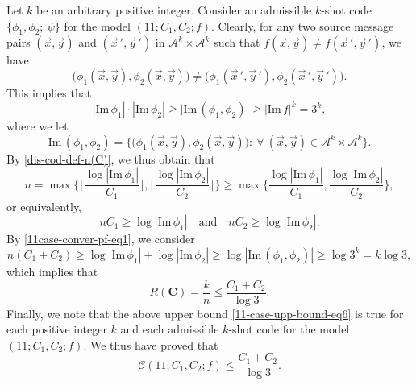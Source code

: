 \documentclass[11pt,draftclsnofoot,onecolumn]{IEEEtran}
\newcommand{\mbC}{\mathbf{C}}
\def\Im{\mathrm{Im}}
\begin{document}
\begin{IEEEproof}
Let $k$ be an arbitrary positive integer.
Consider an admissible $k$-shot code  $\big\{\phi_{1},\phi_{2};~\psi\big\}$ for the model $(11;C_1,C_2;f)$.
Clearly,  for any two  source message pairs $(\vec{x},\vec{y})$ and $(\vec{x}\,',\vec{y}\,')$ in $\mathcal{A}^k\times\mathcal{A}^k$ such that $f(\vec{x},\vec{y})\neq f(\vec{x}\,',\vec{y}\,')$, we have
\begin{equation*}
\big(\phi_{1}(\vec{x},\vec{y}),\phi_{2}(\vec{x},\vec{y})\big)\neq
\big(\phi_{1}(\vec{x}\,',\vec{y}\,'),\phi_{2}(\vec{x}\,',\vec{y}\,')\big)
.\label{eq:case11,converse-pf-0}
\end{equation*}
This implies that
\begin{equation}
|\Im\,\phi_1|\cdot|\Im\,\phi_2|\geq\big|\Im\,(\phi_{1},\phi_{2})\big|\geq |\Im\,f|^k=3^k,\label{11case-conver-pf-eq1}
\end{equation}
where we let
\begin{equation*}
\Im\,(\phi_{1},\phi_{2})=\Big\{\big(\phi_{1}(\vec{x},\vec{y}),\phi_{2}(\vec{x},\vec{y})\big):~\forall~
(\vec{x},\vec{y})\in\mathcal{A}^k\times\mathcal{A}^k\Big\}.
\end{equation*}
By \eqref{dis-cod-def-n(C)}, we thus obtain that
\begin{equation*}
n=\max\bigg\{\bigg\lceil\frac{\log|\Im\,\phi_{1}|}{C_1}\bigg\rceil,\bigg\lceil\frac{\log|\Im\,\phi_{2}|}{C_2}
\bigg\rceil\bigg\}\geq\max\bigg\{\frac{\log|\Im\,\phi_{1}|}{C_1},\frac{\log|\Im\,\phi_{2}|}{C_2}
\bigg\},
\end{equation*}
or equivalently,
\begin{equation*}
n C_1\geq \log|\Im\,\phi_{1}|\quad\text{and}\quad n C_2\geq \log|\Im\,\phi_{2}|.
\end{equation*}
By \eqref{11case-conver-pf-eq1}, we consider
\begin{equation*}
n(C_1+C_2)\geq\log|\Im\,\phi_{1}|+\log|\Im\,\phi_{2}|\geq \log|\Im\,(\phi_{1},\phi_{2})|\geq\log3^k=k\log3,
\end{equation*}
which implies that
\begin{equation}
R(\mbC)=\frac{k}{n}\leq\frac{C_1+C_2}{\log3}.\label{11-case-upp-bound-eq6}
\end{equation}
Finally, we note that the above upper bound \eqref{11-case-upp-bound-eq6}  is true for each positive integer $k$ and each admissible $k$-shot code   for the model $(11;C_1,C_2;f)$. We thus have proved that
\begin{equation*}
\mathcal{C}(11;C_1,C_2;f)\leq\frac{C_1+C_2}{\log3}.\label{11-case-upp-bound}
\end{equation*}


\end{IEEEproof}
\end{document}
